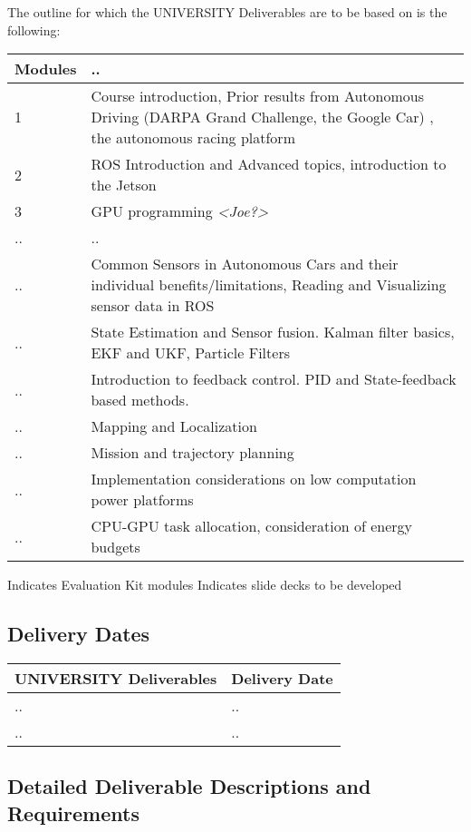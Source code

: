 \documentclass{article}[14pt]
\begin{document}
\pagebreak

The outline for which the UNIVERSITY Deliverables are to be based on is the following:

\begin{center}
\begin{tabular}{ | l || l |}
\hline
Modules & .. \\
\hline
1 & Course introduction, Prior results from Autonomous Driving (DARPA Grand Challenge, the Google Car) , the autonomous racing platform \\
\hline
2 & ROS Introduction and Advanced topics, introduction to the Jetson \\
\hline
3 & GPU programming \emph{<Joe?>} \\
\hline
.. & ..\\
\hline
.. & Common Sensors in Autonomous Cars and their individual benefits/limitations, Reading and Visualizing sensor data in ROS \\
\hline
..  & State Estimation and Sensor fusion. Kalman filter basics, EKF and UKF,  Particle Filters \\
\hline
.. & Introduction to feedback control. PID and State-feedback based methods. \\
\hline
.. & Mapping and Localization \\
\hline
.. & Mission and trajectory planning \\
\hline
.. & Implementation considerations on low computation power platforms \\
\hline 
.. & CPU-GPU task allocation, consideration of energy budgets \\
\hline
\end{tabular}
\end{center}

Indicates Evaluation Kit modules
Indicates slide decks to be developed

\subsection{Delivery Dates}
\begin{center}
\begin{tabular}{ | l | l |}
\hline
UNIVERSITY Deliverables & Delivery Date \\
\hline
.. & ..\\
\hline
.. & ..\\
\hline
\end{tabular}
\end{center}

\subsection{Detailed Deliverable Descriptions and Requirements}
\end{document}
